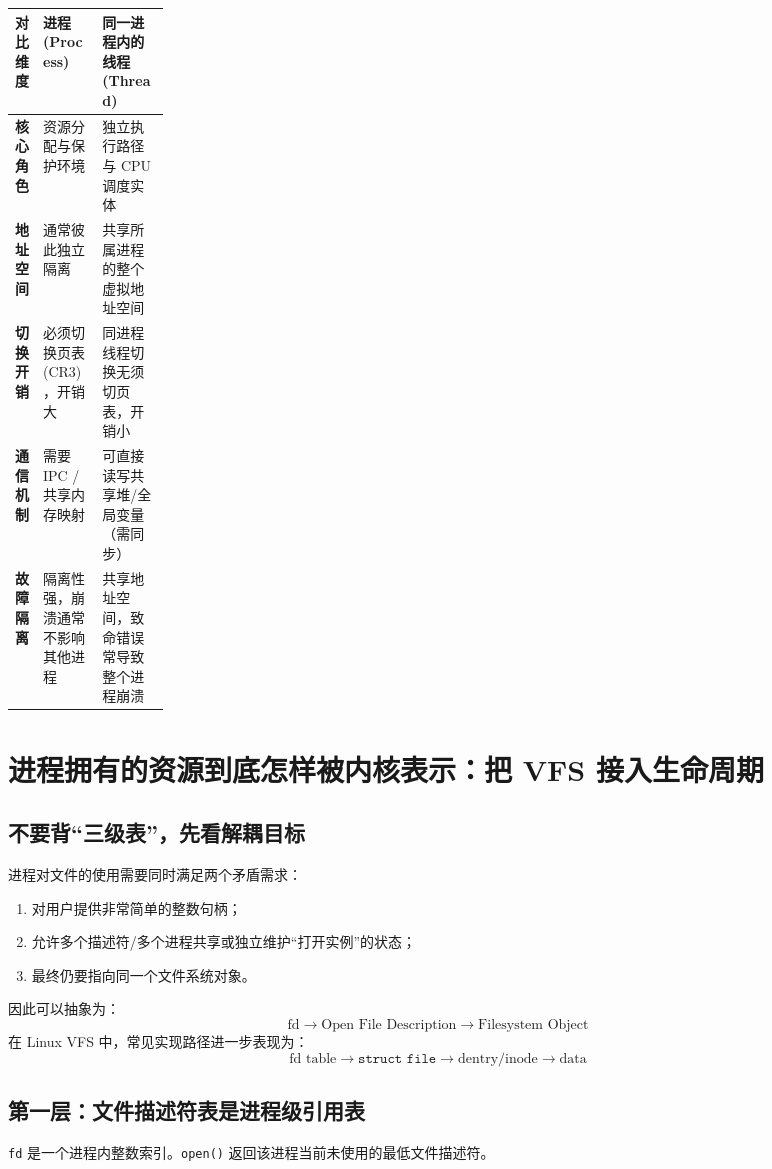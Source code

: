 \documentclass[11pt,a4paper]{ctexart}
\newcommand{\code}[1]{\texttt{#1}}
\begin{document}
\begingroup
\small
\renewcommand{\arraystretch}{1.25}
\setlength{\tabcolsep}{6pt}
\begin{tabularx}{\linewidth}{>{\bfseries}p{0.18\linewidth} X X}
\toprule
对比维度 & 进程 (Process) & 同一进程内的线程 (Thread)\\
\midrule
核心角色 & 资源分配与保护环境 & 独立执行路径与 CPU 调度实体\\
地址空间 & 通常彼此独立隔离 & 共享所属进程的整个虚拟地址空间\\
切换开销 & 必须切换页表 (CR3)，开销大 & 同进程线程切换无须切页表，开销小\\
通信机制 & 需要 IPC / 共享内存映射 & 可直接读写共享堆/全局变量（需同步）\\
故障隔离 & 隔离性强，崩溃通常不影响其他进程 & 共享地址空间，致命错误常导致整个进程崩溃\\
\bottomrule
\end{tabularx}
\endgroup

\section{进程拥有的资源到底怎样被内核表示：把 VFS 接入生命周期}

\subsection{不要背“三级表”，先看解耦目标}

进程对文件的使用需要同时满足两个矛盾需求：
\begin{enumerate}
\item 对用户提供非常简单的整数句柄；
\item 允许多个描述符/多个进程共享或独立维护“打开实例”的状态；
\item 最终仍要指向同一个文件系统对象。
\end{enumerate}

因此可以抽象为：
\[
\boxed{\text{fd}\rightarrow\text{Open File Description}\rightarrow\text{Filesystem Object}}
\]
在 Linux VFS 中，常见实现路径进一步表现为：
\[
\boxed{\text{fd table}\rightarrow\texttt{struct file}\rightarrow\text{dentry/inode}\rightarrow\text{data}}
\]

\subsection{第一层：文件描述符表是进程级引用表}

\code{fd} 是一个进程内整数索引。\code{open()} 返回该进程当前未使用的最低文件描述符。
\end{document}
